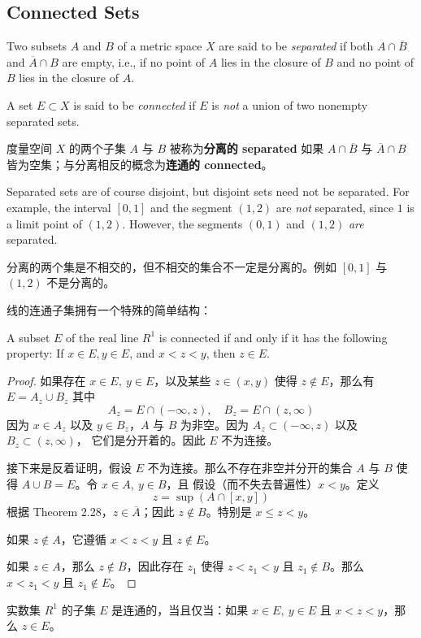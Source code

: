 \documentclass[../poma-notes.tex]{subfiles}
\begin{document}
\subsection*{Connected Sets}

\begin{definition}
  Two subsets $A$ and $B$ of a metric space $X$ are said to be \textit{separated} if both $A \cap \overline{B}$
  and $\overline{A} \cap B$ are empty, i.e., if no point of $A$ lies in the closure of $B$ and no point of $B$
  lies in the closure of $A$.

  A set $E \subset X$ is said to be \textit{connected} if $E$ is \textit{not} a union of two nonempty separated
  sets.
\end{definition}

\begin{anote}
  度量空间 $X$ 的两个子集 $A$ 与 $B$ 被称为\textbf{分离的 separated} 如果 $A \cap \overline{B}$ 与
  $\overline{A} \cap B$ 皆为空集；与分离相反的概念为\textbf{连通的 connected}。
\end{anote}

\begin{remark}
  Separated sets are of course disjoint, but disjoint sets need not be separated. For example, the interval $[0,1]$
  and the segment $(1,2)$ are \textit{not} separated, since $1$ is a limit point of $(1,2)$. However, the segments
  $(0,1)$ and $(1,2)$ \textit{are} separated.
\end{remark}

\begin{anote}
  分离的两个集是不相交的，但不相交的集合不一定是分离的。例如 $[0,1]$ 与 $(1,2)$ 不是分离的。
\end{anote}


线的连通子集拥有一个特殊的简单结构：

\begin{theorem}
  A subset $E$ of the real line $R^1$ is connected if and only if it has the following property: If $x\in E, y\in E$,
  and $x<z<y$, then $z\in E$.
\end{theorem}

\begin{proof}
  如果存在 $x \in E,\ y \in E$，以及某些 $z \in (x,y)$ 使得 $z \notin E$，那么有 $E = A_z \cup B_z$ 其中
  \[A_z = E \cap (-\infty,z), \quad B_z = E \cap (z, \infty)\]
  因为 $x \in A_z$ 以及 $y \in B_z$，$A$ 与 $B$ 为非空。因为 $A_z \subset (-\infty,z)$ 以及 $B_z \subset (z,\infty)$，
  它们是分开着的。因此 $E$ 不为连接。

  接下来是反着证明，假设 $E$ 不为连接。那么不存在非空并分开的集合 $A$ 与 $B$ 使得 $A \cup B = E$。令 $x \in A,\ y \in B$，且
  假设（而不失去普遍性）$x < y$。定义
  \[z = \sup(A \cap [x, y])\]
  根据 Theorem 2.28，$z \in \overline{A}$；因此 $z \notin B$。特别是 $x \le z < y$。

  如果 $z \notin A$，它遵循 $x < z < y$ 且 $z \notin E$。

  如果 $z \in A$，那么 $z \notin \overline{B}$，因此存在 $z_1$ 使得 $z < z_1 < y$ 且 $z_1 \notin B$。那么 $x < z_1 < y$
  且 $z_1 \notin E$。
\end{proof}

\begin{anote}
  实数集 $R^1$ 的子集 $E$ 是连通的，当且仅当：如果 $x \in E,\ y \in E$ 且 $x < z < y$，那么 $z \in E$。
\end{anote}
\end{document}
